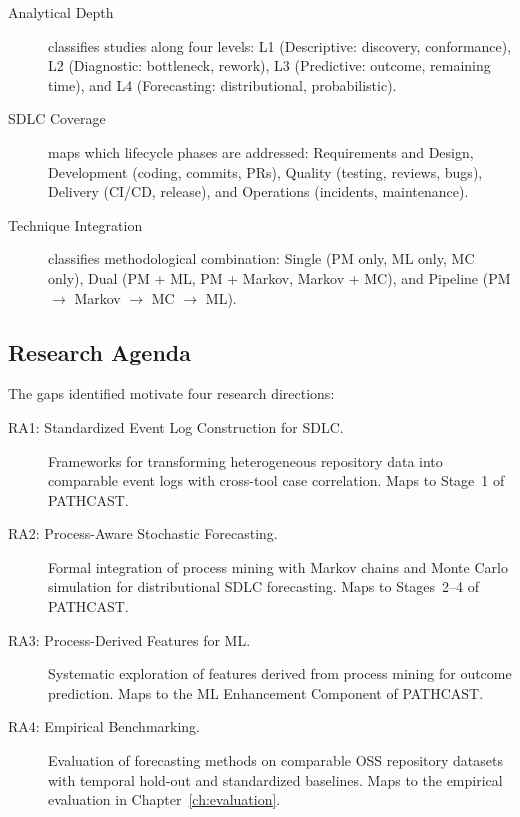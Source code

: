 \begin{description}
\item[Analytical Depth] classifies studies along four levels: L1
  (Descriptive: discovery, conformance), L2 (Diagnostic: bottleneck, rework),
  L3 (Predictive: outcome, remaining time), and L4 (Forecasting:
  distributional, probabilistic).

\item[SDLC Coverage] maps which lifecycle phases are addressed: Requirements
  and Design, Development (coding, commits, PRs), Quality (testing, reviews,
  bugs), Delivery (CI/CD, release), and Operations (incidents, maintenance).

\item[Technique Integration] classifies methodological combination:
  Single (PM only, ML only, MC only), Dual (PM + ML, PM + Markov, Markov + MC),
  and Pipeline (PM $\rightarrow$ Markov $\rightarrow$ MC $\rightarrow$ ML).
\end{description}


\subsection{Research Agenda}
\label{sec:slr-agenda}

The gaps identified motivate four research directions:

\begin{description}
\item[RA1: Standardized Event Log Construction for SDLC.]
  Frameworks for transforming heterogeneous repository data into comparable
  event logs with cross-tool case correlation. Maps to Stage~1 of PATHCAST.

\item[RA2: Process-Aware Stochastic Forecasting.]
  Formal integration of process mining with Markov chains and Monte Carlo
  simulation for distributional SDLC forecasting. Maps to Stages~2--4 of
  PATHCAST.

\item[RA3: Process-Derived Features for ML.]
  Systematic exploration of features derived from process mining for outcome
  prediction. Maps to the ML Enhancement Component of PATHCAST.

\item[RA4: Empirical Benchmarking.]
  Evaluation of forecasting methods on comparable OSS repository datasets with
  temporal hold-out and standardized baselines. Maps to the empirical
  evaluation in Chapter~\ref{ch:evaluation}.
\end{description}


